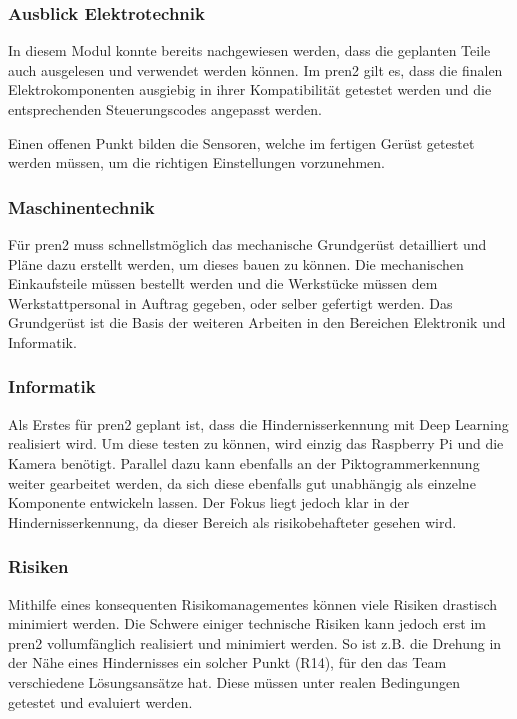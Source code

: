 \subsubsection{Ausblick Elektrotechnik}
In diesem Modul konnte bereits nachgewiesen werden, dass die geplanten Teile auch ausgelesen und verwendet werden können. Im \acrshort{pren2} gilt es, dass die finalen Elektrokomponenten ausgiebig in ihrer Kompatibilität getestet werden und die entsprechenden Steuerungscodes angepasst werden.

Einen offenen Punkt bilden die Sensoren, welche im fertigen Gerüst getestet werden müssen, um die richtigen Einstellungen vorzunehmen.

\subsubsection{Maschinentechnik}
Für \acrshort{pren2} muss schnellstmöglich das mechanische Grundgerüst detailliert und Pläne dazu erstellt werden, um dieses bauen zu können. Die mechanischen Einkaufsteile müssen bestellt werden und die Werkstücke müssen dem Werkstattpersonal in Auftrag gegeben, oder selber gefertigt werden. Das Grundgerüst ist die Basis der weiteren Arbeiten in den Bereichen Elektronik und Informatik. 


\subsubsection{Informatik}
Als Erstes für \acrshort{pren2} geplant ist, dass die Hindernisserkennung mit Deep Learning realisiert wird. Um diese testen zu können, wird einzig das Raspberry Pi und die Kamera benötigt. Parallel dazu kann ebenfalls an der Piktogrammerkennung weiter gearbeitet werden, da sich diese ebenfalls gut unabhängig als einzelne Komponente entwickeln lassen. Der Fokus liegt jedoch klar in der Hindernisserkennung, da dieser Bereich als risikobehafteter gesehen wird.



\subsubsection{Risiken}
Mithilfe eines konsequenten Risikomanagementes können viele Risiken drastisch minimiert werden. Die Schwere einiger technische Risiken kann jedoch erst im \acrshort{pren2} vollumfänglich realisiert und minimiert werden. So ist z.B. die Drehung in der Nähe eines Hindernisses ein solcher Punkt (R14), für den das Team verschiedene Lösungsansätze hat. Diese müssen unter realen Bedingungen getestet und evaluiert werden.

